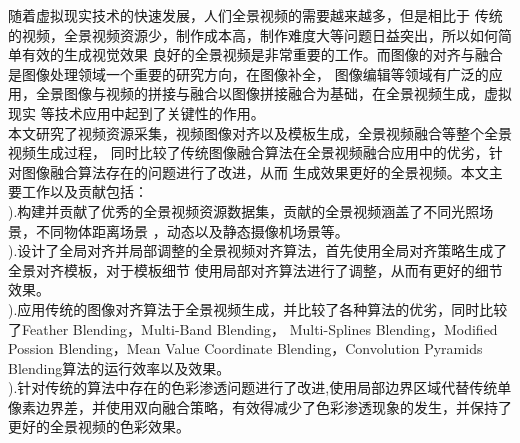 \begin{cabstract}
  随着虚拟现实技术的快速发展，人们全景视频的需要越来越多，但是相比于
  传统的视频，全景视频资源少，制作成本高，制作难度大等问题日益突出，所以如何简单有效的生成视觉效果
  良好的全景视频是非常重要的工作。而图像的对齐与融合是图像处理领域一个重要的研究方向，在图像补全，
  图像编辑等领域有广泛的应用，全景图像与视频的拼接与融合以图像拼接融合为基础，在全景视频生成，虚拟现实
  等技术应用中起到了关键性的作用。\\
  \indent 本文研究了视频资源采集，视频图像对齐以及模板生成，全景视频融合等整个全景视频生成过程，
  同时比较了传统图像融合算法在全景视频融合应用中的优劣，针对图像融合算法存在的问题进行了改进，从而
  生成效果更好的全景视频。本文主要工作以及贡献包括：\\
  ).构建并贡献了优秀的全景视频资源数据集，贡献的全景视频涵盖了不同光照场景，不同物体距离场景
  ，动态以及静态摄像机场景等。\\
  ).设计了全局对齐并局部调整的全景视频对齐算法，首先使用全局对齐策略生成了全景对齐模板，对于模板细节
  使用局部对齐算法进行了调整，从而有更好的细节效果。\\
  ).应用传统的图像对齐算法于全景视频生成，并比较了各种算法的优劣，同时比较了Feather Blending，Multi-Band Blending，
  Multi-Splines Blending，Modified Possion Blending，Mean Value Coordinate Blending，Convolution Pyramids Blending算法的运行效率以及效果。\\
  ).针对传统的算法中存在的色彩渗透问题进行了改进,使用局部边界区域代替传统单像素边界差，并使用双向融合策略，有效得减少了色彩渗透现象的发生，并保持了更好的全景视频的色彩效果。\\



\end{cabstract}


